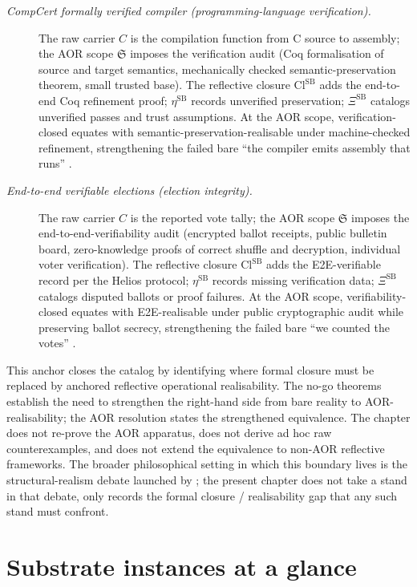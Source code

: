 \documentclass[11pt]{article}
\theoremstyle{definition}
\begin{document}
\begin{description}
\item[\emph{{CompCert} formally verified compiler
(programming-language verification).}]
The raw carrier \(C\) is the compilation function
from C source to assembly; the AOR scope
\(\mathfrak S\) imposes the verification audit (Coq
formalisation of source and target semantics,
mechanically checked semantic-preservation
theorem, small trusted base).  The reflective
closure \(\mathrm{Cl}^{\mathrm{SB}}\) adds the
end-to-end Coq refinement proof;
\(\eta^{\mathrm{SB}}\) records unverified
preservation; \(\Xi^{\mathrm{SB}}\) catalogs
unverified passes and trust assumptions.  At the
AOR scope, verification-closed equates with
semantic-preservation-realisable under
machine-checked refinement, strengthening the
failed bare ``the compiler emits assembly that
runs'' \citep{Leroy2009Formal}.

\item[\emph{End-to-end verifiable elections
(election integrity).}]
The raw carrier \(C\) is the reported vote tally;
the AOR scope \(\mathfrak S\) imposes the
end-to-end-verifiability audit (encrypted ballot
receipts, public bulletin board, zero-knowledge
proofs of correct shuffle and decryption,
individual voter verification).  The reflective
closure \(\mathrm{Cl}^{\mathrm{SB}}\) adds the
E2E-verifiable record per the Helios protocol;
\(\eta^{\mathrm{SB}}\) records missing
verification data; \(\Xi^{\mathrm{SB}}\) catalogs
disputed ballots or proof failures.  At the AOR
scope, verifiability-closed equates with
E2E-realisable under public cryptographic audit
while preserving ballot secrecy, strengthening
the failed bare ``we counted the votes''
\citep{Adida2008Helios}.
\end{description}

This anchor closes the catalog by identifying where formal closure
must be replaced by anchored reflective operational realisability.
The no-go theorems establish the need to strengthen the right-hand
side from bare reality to AOR-realisability; the AOR resolution states
the strengthened equivalence.  The chapter does not re-prove the AOR
apparatus, does not derive ad hoc raw counterexamples, and does not
extend the equivalence to non-AOR reflective frameworks.  The
broader philosophical setting in which this boundary lives is the
structural-realism debate launched by \citet{Worrall1989StructuralRealism};
the present chapter does not take a stand in that debate, only
records the formal closure / realisability gap that any such stand
must confront.
 \section{Substrate instances at a glance}\label{sec:substrate-instances}
\end{document}
